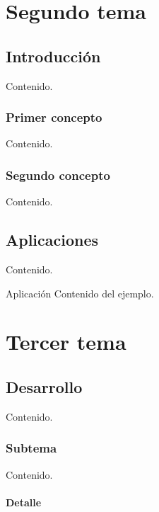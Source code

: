 \documentclass[12pt,oneside]{book}
\begin{document}
\chapter{Segundo tema}

\section{Introducción}

Contenido.

\subsection{Primer concepto}

Contenido.

\subsection{Segundo concepto}

Contenido.

\section{Aplicaciones}

Contenido.

\begin{example}{Aplicación}
Contenido del ejemplo.
\end{example}


\chapter{Tercer tema}

\section{Desarrollo}

Contenido.

\subsection{Subtema}

Contenido.

\subsubsection{Detalle}
\end{document}
